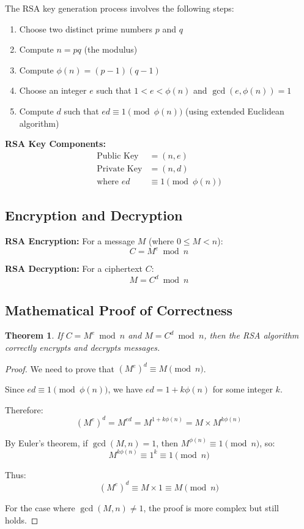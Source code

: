 \documentclass[11pt,a4paper]{article}
\newtheorem{theorem}{Theorem}[section]
\begin{document}
The RSA key generation process involves the following steps:

\begin{enumerate}
    \item Choose two distinct prime numbers $p$ and $q$
    \item Compute $n = pq$ (the modulus)
    \item Compute $\phi(n) = (p-1)(q-1)$
    \item Choose an integer $e$ such that $1 < e < \phi(n)$ and $\gcd(e, \phi(n)) = 1$
    \item Compute $d$ such that $ed \equiv 1 \pmod{\phi(n)}$ (using extended Euclidean algorithm)
\end{enumerate}

\begin{mathbox}
\textbf{RSA Key Components:}
\begin{align*}
\text{Public Key} &= (n, e) \\
\text{Private Key} &= (n, d) \\
\text{where } ed &\equiv 1 \pmod{\phi(n)}
\end{align*}
\end{mathbox}

\subsection{Encryption and Decryption}

\begin{definitionbox}
\textbf{RSA Encryption:} For a message $M$ (where $0 \leq M < n$):
$$C = M^e \bmod n$$

\textbf{RSA Decryption:} For a ciphertext $C$:
$$M = C^d \bmod n$$
\end{definitionbox}

\subsection{Mathematical Proof of Correctness}

\begin{theorem}
If $C = M^e \bmod n$ and $M = C^d \bmod n$, then the RSA algorithm correctly encrypts and decrypts messages.
\end{theorem}

\begin{proof}
We need to prove that $(M^e)^d \equiv M \pmod{n}$.

Since $ed \equiv 1 \pmod{\phi(n)}$, we have $ed = 1 + k\phi(n)$ for some integer $k$.

Therefore:
$$(M^e)^d = M^{ed} = M^{1 + k\phi(n)} = M \times M^{k\phi(n)}$$

By Euler's theorem, if $\gcd(M,n) = 1$, then $M^{\phi(n)} \equiv 1 \pmod{n}$, so:
$$M^{k\phi(n)} \equiv 1^k \equiv 1 \pmod{n}$$

Thus:
$$(M^e)^d \equiv M \times 1 \equiv M \pmod{n}$$

For the case where $\gcd(M,n) \neq 1$, the proof is more complex but still holds.
\end{proof}
\end{document}
